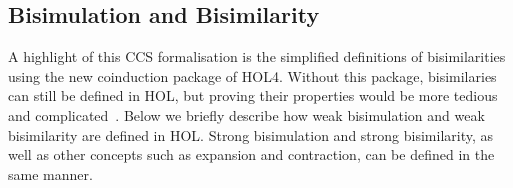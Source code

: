 
\subsection{Bisimulation and Bisimilarity}
\label{ss:bb}

A highlight of this CCS formalisation is the simplified definitions of
bisimilarities using the new coinduction package of
HOL4. Without this package, bisimilaries can still be defined in HOL, but
proving their properties would be more tedious and
complicated~\citep[p.~91]{Mil89}.
Below we briefly describe how weak bisimulation and weak
bisimilarity are defined in HOL.
Strong bisimulation and strong bisimilarity, as well as other
concepts such as expansion and contraction, can be defined
in the same manner.


